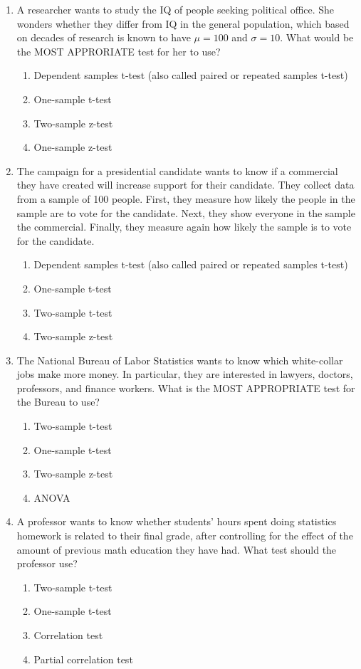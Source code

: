 \documentclass{article}
\begin{document}
\begin{enumerate}[label=\textbf{Q\arabic*:}]
    \item A researcher wants to study the IQ of people seeking political office. She wonders whether they differ from IQ in the general population, which based on decades of research is known to have $\mu = 100$ and $\sigma = 10$. What would be the MOST APPRORIATE test for her to use?
    \begin{enumerate}[label=\alph*)]
        \item Dependent samples t-test (also called paired or repeated samples t-test)
        \item One-sample t-test
        \item Two-sample z-test
        \item One-sample z-test
    \end{enumerate}

    \item The campaign for a presidential candidate wants to know if a commercial they have created will increase support for their candidate. They collect data from a sample of 100 people. First, they measure how likely the people in the sample are to vote for the candidate. Next, they show everyone in the sample the commercial. Finally, they measure again how likely the sample is to vote for the candidate.
    \begin{enumerate}[label=\alph*)]
        \item Dependent samples t-test (also called paired or repeated samples t-test)
        \item One-sample t-test
        \item Two-sample t-test
        \item Two-sample z-test
    \end{enumerate}

    \item The National Bureau of Labor Statistics wants to know which white-collar jobs make more money. In particular, they are interested in lawyers, doctors, professors, and finance workers. What is the MOST APPROPRIATE test for the Bureau to use?
    \begin{enumerate}[label=\alph*)]
        \item Two-sample t-test
        \item One-sample t-test
        \item Two-sample z-test
        \item ANOVA
    \end{enumerate}

    \item A professor wants to know whether students’ hours spent doing statistics homework is related to their final grade, after controlling for the effect of the amount of previous math education they have had. What test should the professor use?
    \begin{enumerate}[label=\alph*)]
        \item Two-sample t-test
        \item One-sample t-test
        \item Correlation test
        \item Partial correlation test
    \end{enumerate}

\end{enumerate}
\end{document}
